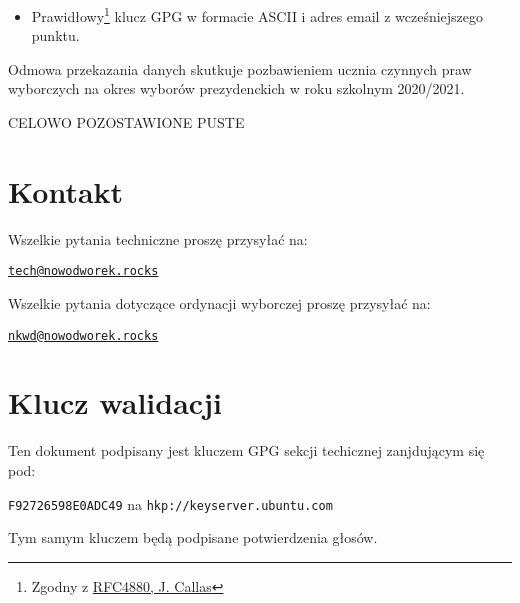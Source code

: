 \begin{itemize}
  \item Prawidłowy\footnote{Zgodny z \href{https://tools.ietf.org/html/rfc4880}{RFC4880, J. Callas}} klucz GPG w formacie ASCII i adres email z wcześniejszego punktu.
\end{itemize}
\vspace{0.3cm} %

Odmowa przekazania danych skutkuje pozbawieniem ucznia czynnych praw wyborczych na okres wyborów prezydenckich w roku szkolnym 2020/2021.

\vfill
\begin{center}
\normalsize \textcolor{white!30!black}{CELOWO POZOSTAWIONE PUSTE}\end{center}
\vfill

\newpage

\vspace{3cm}
\appendix
\section*{}

\section{Kontakt}

Wszelkie pytania techniczne proszę przysyłać na:
\begin{center}\href{mailto:tech@nowodworek.rocks}{\texttt{tech@nowodworek.rocks}}\end{center}
Wszelkie pytania dotyczące ordynacji wyborczej proszę przysyłać na:
\begin{center}\href{mailto:nkwd@nowodworek.rocks}{\texttt{nkwd@nowodworek.rocks}}\end{center}

\section{Klucz walidacji}

Ten dokument podpisany jest kluczem GPG sekcji techicznej zanjdującym się pod:
\begin{center}\texttt{F92726598E0ADC49} na \texttt{hkp://keyserver.ubuntu.com}\\ \end{center}
\noindent Tym samym kluczem będą podpisane potwierdzenia głosów.

